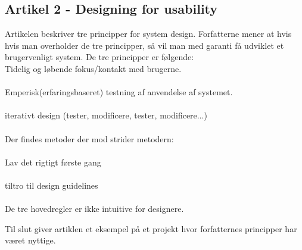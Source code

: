 \documentclass[a4paper,12pt]{article}
\begin{document}
\subsection{Artikel 2 - Designing for usability}
Artikelen beskriver tre principper for system design. Forfatterne mener at hvis
hvis man overholder de tre principper, så vil man med garanti få udviklet et brugervenligt system.  
De tre principper er følgende:
\newline
\\
Tidelig og løbende fokus/kontakt med brugerne.
\\
\\
Emperisk(erfaringsbaseret) testning af anvendelse af systemet.
\\
\\
iterativt design (tester, modificere, tester, modificere...) 
\\
\\
Der findes metoder der mod strider metodern:
\\
\\
Lav det rigtigt første gang 
\\
\\
tiltro til design guidelines
\\
\\
De tre hovedregler er ikke intuitive for designere. 

Til slut giver artiklen et eksempel på et projekt hvor forfatternes principper har været nyttige.
\end{document}
